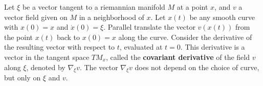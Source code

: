 Let $\xi$ be a vector tangent to a riemannian manifold $M$ at a point $x$, and $v$ a vector field given on $M$ in a neighborhood of $x$. Let $x(t)$ be any smooth curve with $x(0) = x$ and $\dot{x}(0) = \xi$. Parallel translate the vector $v(x(t))$ from the point $x(t)$ back to $x(0) = x$ along the curve. Consider the derivative of the resulting vector with respect to $t$, evaluated at $t = 0$. This derivative is a vector in the tangent space $TM_x$, called the \textbf{covariant derivative} of the field $v$ along $\xi$, denoted by $\nabla_\xi v$. The vector $\nabla_\xi v$ does not depend on the choice of curve, but only on $\xi$ and $v$.
